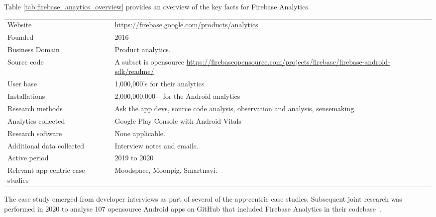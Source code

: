 Table \ref{tab:firebase_anaytics_overview} provides an overview of the key facts for Firebase Analytics.

{\renewcommand{\arraystretch}{0.8}%
\begin{table*}
    \centering
    \small
    \setlength{\tabcolsep}{6pt}
    \begin{tabular}{lp{9cm}}
       \toprule
       Website &\url{https://firebase.google.com/products/analytics} \\
       Founded & 2016\\
       Business Domain & Product analytics. \\
       Source code  & A subset is opensource \url{https://firebaseopensource.com/projects/firebase/firebase-android-sdk/readme/} \\
       \arrayrulecolor{blue!20}\midrule
       User base & 1,000,000's for their analytics \\
       Installations & 2,000,000,000+ for the Android analytics\footnotemark \\
       \arrayrulecolor{blue!20}\midrule
       Research methods &Ask the app devs, source code analysis, observation and analysis, sensemaking. \\
       Analytics collected &Google Play Console with Android Vitals \\
       Research software & None applicable. \\
       Additional data collected &Interview notes and emails. \\
       Active period & 2019 to 2020 \\
       Relevant app-centric case studies & Moodspace, Moonpig, Smartnavi.\\
       \bottomrule
    \end{tabular}
    \caption{Tool Centric Case Study key facts: Firebase Analytics}
    \label{tab:firebase_anaytics_overview}
\end{table*}
}


The case study emerged from developer interviews as part of several of the app-centric case studies. Subsequent joint research was performed in 2020 to analyse 107 opensource Android apps on GitHub that included Firebase Analytics in their codebase~.

